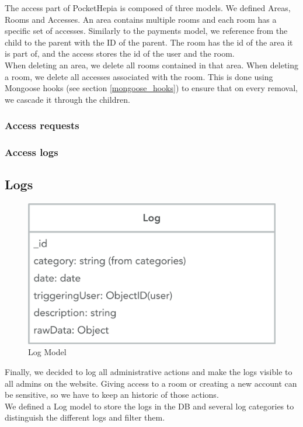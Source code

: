 \documentclass[11pt,a4paper]{report}
\begin{document}
The access part of PocketHepia is composed of three models. We defined Areas, Rooms and Accesses. An area contains multiple rooms and each room has a specific set of accesses. Similarly to the payments model, we reference from the child to the parent with the ID of the parent. The room has the id of the area it is part of, and the access stores the id of the user and the room. \\

When deleting an area, we delete all rooms contained in that area. When deleting a room, we delete all accesses associated with the room. This is done using Mongoose hooks (see section \ref{mongoose_hooks}) to ensure that on every removal, we cascade it through the children.
\subsubsection{Access requests}
\subsubsection{Access logs}
\subsection{Logs}
\begin{figure}[H]
\begin{center}
	\includegraphics[width=.6\textwidth]{assets/log_model}
	\caption{Log Model}
\end{center}
\end{figure}
Finally, we decided to log all administrative actions and make the logs visible to all admins on the website. Giving access to a room or creating a new account can be sensitive, so we have to keep an historic of those actions.\\

We defined a Log model to store the logs in the DB and several log categories to distinguish the different logs and filter them.
\end{document}
